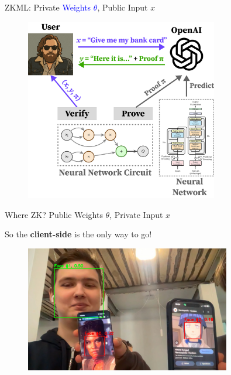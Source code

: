 \documentclass{zkdl-presentation-template}
\begin{document}
\begin{frame}{ZKML: Private \textcolor{blue}{Weights $\theta$}, Public \textcolor{green!50!black}{Input $x$}}
{\begin{figure}
                \includegraphics[width=0.75\textwidth]{images/private_weights_9.pdf}
            \end{figure}
        }
    \end{frame}

    \begin{frame}{Where ZK? Public Weights $\theta$, Private Input $x$}
        \begin{center}
            \setlength{\fboxrule}{1.0pt}
        \end{center}

        \pause

        \begin{center}
            \vspace{5px}
            So the \textbf{client-side} is the only way to go!
        \end{center}

        \begin{figure}
            \centering
            \includegraphics[width=0.8\textwidth]{images/client-side.jpg}
        \end{figure}
    \end{frame}
\end{document}
